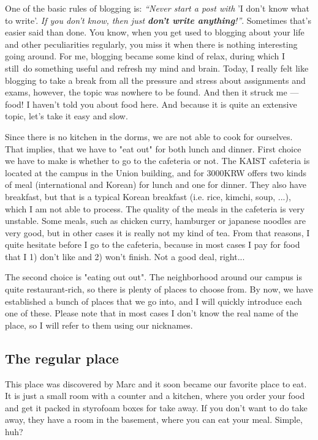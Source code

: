 \begin{post}
	\begin{content}
One of the basic rules of blogging is: \textit{``Never start a post with} 'I don't know what to write'. \textit{If you don't know, then just \textbf{don't write anything}!''}. Sometimes that's easier said than done. You know, when you get used to blogging about your life and other peculiarities regularly, you miss it when there is nothing interesting going around. For me, blogging became some kind of relax, during which I still do something useful and refresh my mind and brain. Today, I really felt like blogging to take a break from all the pressure and stress about assignments and exams, however, the topic was nowhere to be found. And then it struck me — food! I haven't told you about food here. And because it is quite an extensive topic, let's take it easy and slow.

Since there is no kitchen in the dorms, we are not able to cook for ourselves. That implies, that we have to "eat out" for both lunch and dinner. First choice we have to make is whether to go to the cafeteria or not. The KAIST cafeteria is located at the campus in the Union building, and for 3000KRW offers two kinds of meal (international and Korean) for lunch and one for dinner. They also have breakfast, but that is a typical Korean breakfast (i.e. rice, kimchi, soup, ...), which I am not able to process. The quality of the meals in the cafeteria is very unstable. Some meals, such as chicken curry, hamburger or japanese noodles are very good, but in other cases it is really not my kind of tea. From that reasons, I quite hesitate before I go to the cafeteria, because in most cases I pay for food that I 1) don't like and 2) won't finish. Not a good deal, right...

The second choice is "eating out out". The neighborhood around our campus is quite restaurant-rich, so there is plenty of places to choose from. By now, we have established a bunch of places that we go into, and I will quickly introduce each one of these. Please note that in most cases I don't know the real name of the place, so I will refer to them using our nicknames.

\subsection{The regular place}
This place was discovered by Marc and it soon became our favorite place to eat. It is just a small room with a counter and a kitchen, where you order your food and get it packed in styrofoam boxes for take away. If you don't want to do take away, they have a room in the basement, where you can eat your meal. Simple, huh?


\end{content}
\end{post}
